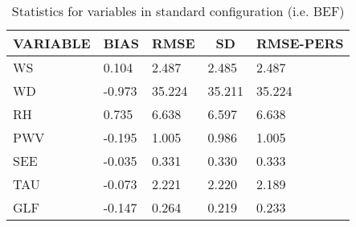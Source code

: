 \begin{table}[]
\begin{center}
\begin{tabular}{|l|l|l|l|l|}
\hline
\multicolumn{1}{c|}{\cellcolor[HTML]{C0C0C0}\textbf{VARIABLE}} & \multicolumn{1}{c|}{\cellcolor[HTML]{C0C0C0}\textbf{BIAS}} & \multicolumn{1}{c|}{\cellcolor[HTML]{C0C0C0}\textbf{RMSE}} & \multicolumn{1}{c|}{\cellcolor[HTML]{C0C0C0}\textbf{SD}} & \multicolumn{1}{c|}{\cellcolor[HTML]{C0C0C0}\textbf{RMSE-PERS}}\\\hline
\cellcolor[HTML]{C0C0C0}WS  &     0.104                                &     2.487                                &     2.485  &     2.487 \\
\cellcolor[HTML]{C0C0C0}WD  &    -0.973                                &    35.224                                &    35.211  &    35.224 \\
\cellcolor[HTML]{C0C0C0}RH  &     0.735                                &     6.638                                &     6.597  &     6.638 \\
\cellcolor[HTML]{C0C0C0}PWV &    -0.195                               &     1.005                               &     0.986 &     1.005 \\
\cellcolor[HTML]{C0C0C0}SEE &    -0.035                               &     0.331                               &     0.330 &     0.333 \\
\cellcolor[HTML]{C0C0C0}TAU &    -0.073                               &     2.221                               &     2.220 &     2.189 \\
\cellcolor[HTML]{C0C0C0}GLF &    -0.147                               &     0.264                               &     0.219 &     0.233 \\
\hline
\end{tabular}
\caption{Statistics for variables in standard configuration (i.e. BEF)}
\end{center}
\end{table}
